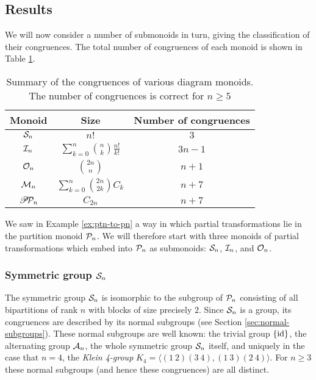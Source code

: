 \subsection{Results}
\label{sec:other-monoids-results}
We will now consider a number of submonoids in turn, giving the classification
of their congruences.  The total number of congruences of each monoid is shown
in Table \ref{tab:other-monoids}.

\begin{table}[h]
  \centering
  \renewcommand\arraystretch{1.5}
  \begin{tabular}{| c | c | c |}
    \hline
    Monoid & Size & Number of congruences \\
    \hline
    $\mathcal{S}_n$ & $n!$ & $3$ \\
    $\mathcal{I}_n$ & $\sum_{k=0}^n \binom{n}{k} \frac{n!}{k!}$ & $3n - 1$ \\
    $\mathcal{O}_n$ & $\binom{2n}{n}$ & $n + 1$ \\
    $\mathcal{M}_n$ & $\sum_{k=0}^n \binom{2n}{2k}C_k$ & $n + 7$ \\
    $\mathscr{P}\!\mathcal{P}_n$ & $C_{2n}$ & $n + 7$ \\
    \hline
  \end{tabular}
  \caption{Summary of the congruences of various diagram monoids.  The number of
  congruences is correct for $n \geq 5$}
  \label{tab:other-monoids}
\end{table}

We saw in Example \ref{ex:ptn-to-pn} a way in which partial transformations lie
in the partition monoid $\mathcal{P}_n$.  We will therefore start with three monoids of
partial transformations which embed into $\mathcal{P}_n$ as submonoids: $\mathcal{S}_n$,
$\mathcal{I}_n$, and $\mathcal{O}_n$.

\subsubsection{Symmetric group $\mathcal{S}_n$}
The symmetric group $\mathcal{S}_n$ is isomorphic to the subgroup of $\mathcal{P}_n$
consisting of all bipartitions of rank $n$ with blocks of size precisely $2$.
Since $\mathcal{S}_n$ is a group, its congruences are described by its normal subgroups
(see Section \ref{sec:normal-subgroups}).  These normal subgroups are well
known: the trivial group $\{\operatorname{id}\}$, the alternating group $\mathcal{A}_n$, the whole
symmetric group $\mathcal{S}_n$ itself, and uniquely in the case that $n=4$, the
\textit{Klein 4-group} $K_4 = \langle (1~2)(3~4), (1~3)(2~4) \rangle$.  For
$n \geq 3$ these normal subgroups (and hence these congruences) are all
distinct.

